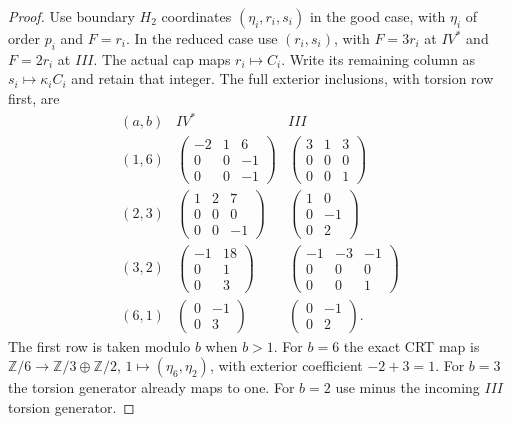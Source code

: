 \begin{proof}
Use boundary $H_2$ coordinates $(\eta_i,r_i,s_i)$ in the good
case, with $\eta_i$ of order $p_i$ and $F=r_i$.
In the reduced case use $(r_i,s_i)$, with $F=3r_i$ at $IV^*$
and $F=2r_i$ at $III$. The actual cap maps $r_i\mapsto C_i$.
Write its remaining column as $s_i\mapsto\kappa_iC_i$ and
retain that integer.
The full exterior inclusions, with torsion row first, are
\[
\begin{array}{c|c|c}
(a,b)&IV^*&III\\ \hline
(1,6)&\begin{pmatrix}-2&1&6\\0&0&-1\\0&0&-1\end{pmatrix}
 &\begin{pmatrix}3&1&3\\0&0&0\\0&0&1\end{pmatrix}\\[5pt]
(2,3)&\begin{pmatrix}1&2&7\\0&0&0\\0&0&-1\end{pmatrix}
 &\begin{pmatrix}1&0\\0&-1\\0&2\end{pmatrix}\\[5pt]
(3,2)&\begin{pmatrix}-1&18\\0&1\\0&3\end{pmatrix}
 &\begin{pmatrix}-1&-3&-1\\0&0&0\\0&0&1\end{pmatrix}\\[5pt]
(6,1)&\begin{pmatrix}0&-1\\0&3\end{pmatrix}
 &\begin{pmatrix}0&-1\\0&2\end{pmatrix}.
\end{array}                                                     \tag{F46.15}
\]
The first row is taken modulo $b$ when $b>1$.
For $b=6$ the exact CRT map is
$\mathbb Z/6\to\mathbb Z/3\oplus\mathbb Z/2$,
$1\mapsto(\eta_6,\eta_2)$, with exterior coefficient
$-2+3=1$. For $b=3$ the torsion generator already maps to one.
For $b=2$ use minus the incoming $III$ torsion generator.


\end{proof}
